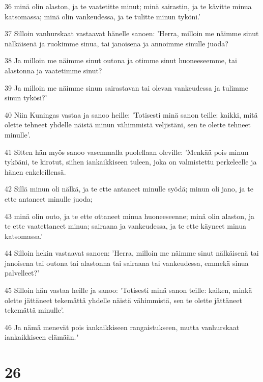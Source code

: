 \par 36 minä olin alaston, ja te vaatetitte minut; minä sairastin, ja te kävitte minua katsomassa; minä olin vankeudessa, ja te tulitte minun tyköni.'
\par 37 Silloin vanhurskaat vastaavat hänelle sanoen: 'Herra, milloin me näimme sinut nälkäisenä ja ruokimme sinua, tai janoisena ja annoimme sinulle juoda?
\par 38 Ja milloin me näimme sinut outona ja otimme sinut huoneeseemme, tai alastonna ja vaatetimme sinut?
\par 39 Ja milloin me näimme sinun sairastavan tai olevan vankeudessa ja tulimme sinun tykösi?'
\par 40 Niin Kuningas vastaa ja sanoo heille: 'Totisesti minä sanon teille: kaikki, mitä olette tehneet yhdelle näistä minun vähimmistä veljistäni, sen te olette tehneet minulle'.
\par 41 Sitten hän myös sanoo vasemmalla puolellaan oleville: 'Menkää pois minun tyköäni, te kirotut, siihen iankaikkiseen tuleen, joka on valmistettu perkeleelle ja hänen enkeleillensä.
\par 42 Sillä minun oli nälkä, ja te ette antaneet minulle syödä; minun oli jano, ja te ette antaneet minulle juoda;
\par 43 minä olin outo, ja te ette ottaneet minua huoneeseenne; minä olin alaston, ja te ette vaatettaneet minua; sairaana ja vankeudessa, ja te ette käyneet minua katsomassa.'
\par 44 Silloin hekin vastaavat sanoen: 'Herra, milloin me näimme sinut nälkäisenä tai janoisena tai outona tai alastonna tai sairaana tai vankeudessa, emmekä sinua palvelleet?'
\par 45 Silloin hän vastaa heille ja sanoo: 'Totisesti minä sanon teille: kaiken, minkä olette jättäneet tekemättä yhdelle näistä vähimmistä, sen te olette jättäneet tekemättä minulle'.
\par 46 Ja nämä menevät pois iankaikkiseen rangaistukseen, mutta vanhurskaat iankaikkiseen elämään."

\chapter{26}

